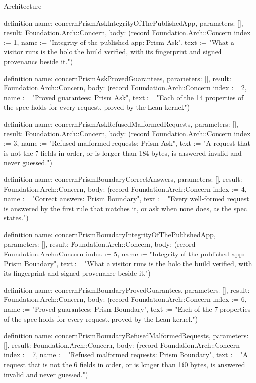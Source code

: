 \begin{lexlean}{Architecture}
\begin{semanticmodule}
definition{
  name: concernPrismAskIntegrityOfThePublishedApp,
  parameters: [],
  result: Foundation.Arch::Concern,
  body: (record Foundation.Arch::Concern {index := 1, name := "Integrity of the published app: Prism Ask", text := "What a visitor runs is the holo the build verified, with its fingerprint and signed provenance beside it."})
}

definition{
  name: concernPrismAskProvedGuarantees,
  parameters: [],
  result: Foundation.Arch::Concern,
  body: (record Foundation.Arch::Concern {index := 2, name := "Proved guarantees: Prism Ask", text := "Each of the 14 properties of the spec holds for every request, proved by the Lean kernel."})
}

definition{
  name: concernPrismAskRefusedMalformedRequests,
  parameters: [],
  result: Foundation.Arch::Concern,
  body: (record Foundation.Arch::Concern {index := 3, name := "Refused malformed requests: Prism Ask", text := "A request that is not the 7 fields in order, or is longer than 184 bytes, is answered invalid and never guessed."})
}

definition{
  name: concernPrismBoundaryCorrectAnswers,
  parameters: [],
  result: Foundation.Arch::Concern,
  body: (record Foundation.Arch::Concern {index := 4, name := "Correct answers: Prism Boundary", text := "Every well-formed request is answered by the first rule that matches it, or ask when none does, as the spec states."})
}

definition{
  name: concernPrismBoundaryIntegrityOfThePublishedApp,
  parameters: [],
  result: Foundation.Arch::Concern,
  body: (record Foundation.Arch::Concern {index := 5, name := "Integrity of the published app: Prism Boundary", text := "What a visitor runs is the holo the build verified, with its fingerprint and signed provenance beside it."})
}

definition{
  name: concernPrismBoundaryProvedGuarantees,
  parameters: [],
  result: Foundation.Arch::Concern,
  body: (record Foundation.Arch::Concern {index := 6, name := "Proved guarantees: Prism Boundary", text := "Each of the 7 properties of the spec holds for every request, proved by the Lean kernel."})
}

definition{
  name: concernPrismBoundaryRefusedMalformedRequests,
  parameters: [],
  result: Foundation.Arch::Concern,
  body: (record Foundation.Arch::Concern {index := 7, name := "Refused malformed requests: Prism Boundary", text := "A request that is not the 6 fields in order, or is longer than 160 bytes, is answered invalid and never guessed."})
}


\end{semanticmodule}
\end{lexlean}
